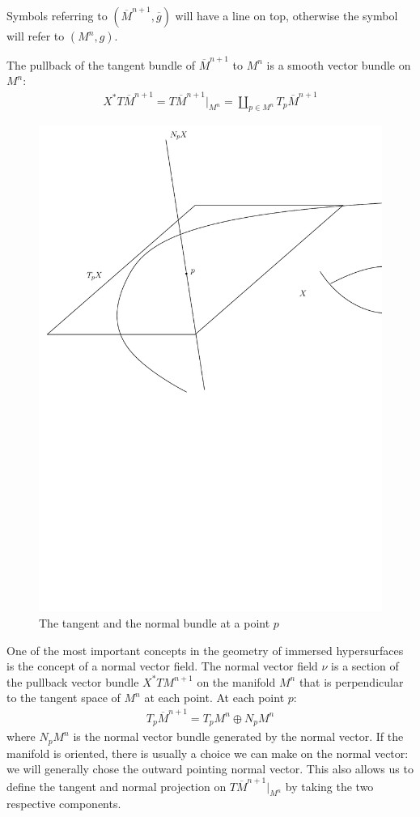Symbols referring to $(\overline{M}^{n+1}, \overline{g})$ will have a line on top, otherwise the symbol will refer to $(M^{n}, g)$.


The pullback of the tangent bundle of $\overline{M}^{n+1}$ to
$M^{n}$ is a smooth vector bundle on $M^{n}$:
\begin{align*}
	X^{*}T\overline{M}^{n+1}=T\overline{M}^{n+1}|_{M^n}= \amalg_{p \in M^n} T_p\overline{M}^{n+1}
\end{align*} 

\begin{figure}
	\centering
	\includegraphics[width=\textwidth]{figures/2_tangent_and_normal_bundles}
	\caption{The tangent and the normal bundle at a point $p$}
\end{figure}


One of the most important concepts in the geometry of immersed hypersurfaces is the concept of a normal vector field. The normal vector field $\nu$ is a section of the pullback vector bundle $X^* TM^{n+1}$ on the manifold $M^n$ that is perpendicular to the tangent space of $M^n$ at each point. At each point $p$:
\begin{align*}
	T_p\overline{M}^{n+1}=T_pM^{n}\oplus N_pM^{n}
\end{align*} 
where $N_pM^{n}$ is the normal vector bundle generated by the normal vector. If the manifold is oriented, there is usually a choice we can make on the normal vector: we will generally chose the outward pointing normal vector. This also allows us to define the tangent and normal projection on $T\overline{M}^{n+1}|_{M^n}$ by taking the two respective components. 

